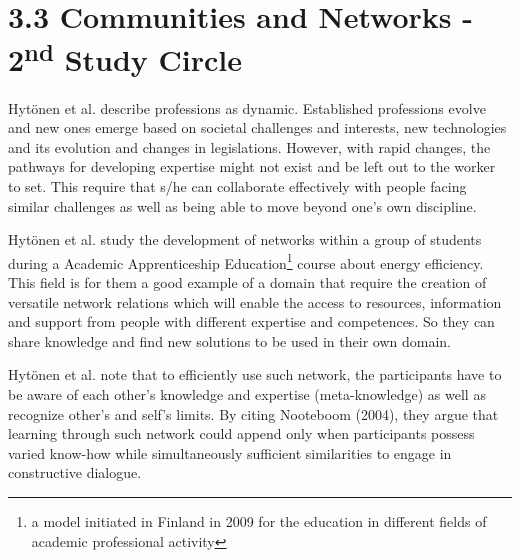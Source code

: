 \section*{3.3 Communities and Networks - 2\textsuperscript{nd} Study Circle}

Hytönen et al. \cite{hytonen2014does} describe professions as dynamic. Established professions evolve and new ones emerge based on societal challenges and interests, new technologies and its evolution and changes in legislations. However, with rapid changes, the pathways for developing expertise might not exist and be left out to the worker to set. This require that s/he can collaborate effectively with people facing similar challenges as well as being able to move beyond one's own discipline.

Hytönen et al. \cite{hytonen2014does} study the development of networks within a group of students during a Academic Apprenticeship Education\footnote{a model initiated in Finland in 2009 for the education in different fields of academic professional activity} course about energy efficiency. This field is for them a good example of a domain that require the creation of versatile network relations which will enable the access to resources, information and
support from people with different expertise and competences. So they can share knowledge and find new solutions to be used in their own domain.

Hytönen et al. \cite{hytonen2014does} note that to efficiently use such network, the participants have to be aware of each other's knowledge and expertise (meta-knowledge) as well as recognize other's and self's limits. By citing Nooteboom (2004), they argue that learning through such network could append only when participants possess varied know-how while simultaneously sufficient similarities to engage in constructive dialogue.